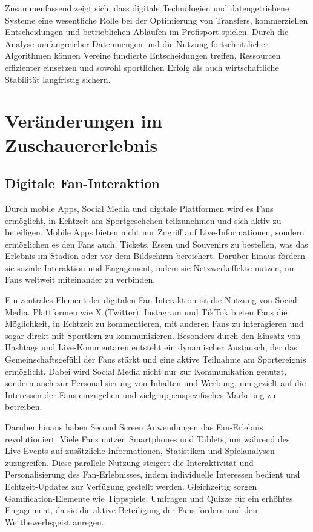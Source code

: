 \documentclass[
  number]{elsarticle}
\begin{document}
Zusammenfassend zeigt sich, dass digitale Technologien und
datengetriebene Systeme eine wesentliche Rolle bei der Optimierung von
Transfers, kommerziellen Entscheidungen und betrieblichen Abläufen im
Profisport spielen. Durch die Analyse umfangreicher Datenmengen und die
Nutzung fortschrittlicher Algorithmen können Vereine fundierte
Entscheidungen treffen, Ressourcen effizienter einsetzen und sowohl
sportlichen Erfolg als auch wirtschaftliche Stabilität langfristig
sichern.

\section{Veränderungen im
Zuschauererlebnis}\label{veruxe4nderungen-im-zuschauererlebnis}

\subsection{Digitale Fan-Interaktion}\label{digitale-fan-interaktion}

Durch mobile Apps, Social Media und digitale Plattformen wird es Fans
ermöglicht, in Echtzeit am Sportgeschehen teilzunehmen und sich aktiv zu
beteiligen. Mobile Apps bieten nicht nur Zugriff auf Live-Informationen,
sondern ermöglichen es den Fans auch, Tickets, Essen und Souvenirs zu
bestellen, was das Erlebnis im Stadion oder vor dem Bildschirm
bereichert. Darüber hinaus fördern sie soziale Interaktion und
Engagement, indem sie Netzwerkeffekte nutzen, um Fans weltweit
miteinander zu verbinden. \citep[pp.~9-10]{glebova_techsports}

Ein zentrales Element der digitalen Fan-Interaktion ist die Nutzung von
Social Media. Plattformen wie X (Twitter), Instagram und TikTok bieten
Fans die Möglichkeit, in Echtzeit zu kommentieren, mit anderen Fans zu
interagieren und sogar direkt mit Sportlern zu kommunizieren. Besonders
durch den Einsatz von Hashtags und Live-Kommentaren entsteht ein
dynamischer Austausch, der das Gemeinschaftsgefühl der Fans stärkt und
eine aktive Teilnahme am Sportereignis ermöglicht. Dabei wird Social
Media nicht nur zur Kommunikation genutzt, sondern auch zur
Personalisierung von Inhalten und Werbung, um gezielt auf die Interessen
der Fans einzugehen und zielgruppenspezifisches Marketing zu betreiben.
\citep[pp.146-150]{glebova_digitaltech}

Darüber hinaus haben Second Screen Anwendungen das Fan-Erlebnis
revolutioniert. Viele Fans nutzen Smartphones und Tablets, um während
des Live-Events auf zusätzliche Informationen, Statistiken und
Spielanalysen zuzugreifen. Diese parallele Nutzung steigert die
Interaktivität und Personalisierung des Fan-Erlebnisses, indem
individuelle Interessen bedient und Echtzeit-Updates zur Verfügung
gestellt werden. Gleichzeitig sorgen Gamification-Elemente wie
Tippspiele, Umfragen und Quizze für ein erhöhtes Engagement, da sie die
aktive Beteiligung der Fans fördern und den Wettbewerbsgeist anregen.
\citep[pp.146-150]{glebova_digitaltech}
\end{document}
